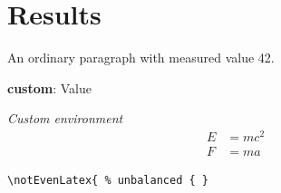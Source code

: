 \documentclass{article}
\newcommand{\privateMacro}[2][default]{\textbf{#1}: #2}
\newenvironment{laboratory}[1]{\par\textit{#1}}{\par}
\begin{document}
\section{Results}\label{sec:results}

An ordinary paragraph with measured value 42.

\privateMacro[custom]{Value \cite{verified2026}} %
\begin{laboratory}{Custom environment}
\begin{align}
  E &= mc^2 \label{eq:energy}\\
  F &= ma
\end{align}
\end{laboratory}
\begin{verbatim}
\notEvenLatex{ % unbalanced { }
\end{verbatim}
\end{document}
